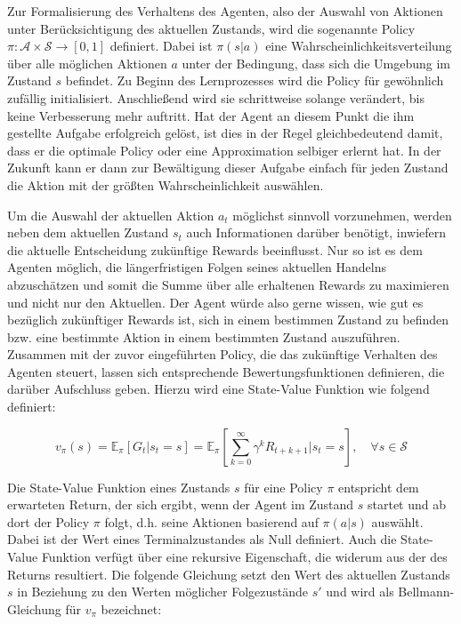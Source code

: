 Zur Formalisierung des Verhaltens des Agenten, also der Auswahl von Aktionen unter Berücksichtigung des aktuellen Zustands, wird die sogenannte Policy $\pi: \mathcal{A} \times \mathcal{S} \to [0, 1]$ definiert. Dabei ist $\pi(s|a)$ eine Wahrscheinlichkeitsverteilung über alle möglichen Aktionen $a$ unter der Bedingung, dass sich die Umgebung im Zustand $s$ befindet. Zu Beginn des Lernprozesses wird die Policy für gewöhnlich zufällig initialisiert. Anschließend wird sie schrittweise solange verändert, bis keine Verbesserung mehr auftritt. Hat der Agent an diesem Punkt die ihm gestellte Aufgabe erfolgreich gelöst, ist dies in der Regel gleichbedeutend damit, dass er die optimale Policy oder eine Approximation selbiger erlernt hat. In der Zukunft kann er dann zur Bewältigung dieser Aufgabe einfach für jeden Zustand die Aktion mit der größten Wahrscheinlichkeit auswählen.

Um die Auswahl der aktuellen Aktion $a_t$ möglichst sinnvoll vorzunehmen, werden neben dem aktuellen Zustand $s_t$ auch Informationen darüber benötigt, inwiefern die aktuelle Entscheidung zukünftige Rewards beeinflusst. Nur so ist es dem Agenten möglich, die längerfristigen Folgen seines aktuellen Handelns abzuschätzen und somit die Summe über alle erhaltenen Rewards zu maximieren und nicht nur den Aktuellen. Der Agent würde also gerne wissen, \glqq wie gut \grqq{} es bezüglich zukünftiger Rewards ist, sich in einem bestimmen Zustand zu befinden bzw. eine bestimmte Aktion in einem bestimmten Zustand auszuführen. Zusammen mit der zuvor eingeführten Policy, die das zukünftige Verhalten des Agenten steuert, lassen sich entsprechende Bewertungsfunktionen definieren, die darüber Aufschluss geben. Hierzu wird eine State-Value Funktion wie folgend definiert:

\begin{equation*}
  v_\pi(s) = \mathbb{E}_\pi[G_t|s_t=s] = \mathbb{E}_\pi[\sum_{k=0}^{\infty} \gamma^k R_{t+k+1} | s_t=s], \quad \forall s \in \mathcal{S}
  \label{v_pi_eq}
\end{equation*}

Die State-Value Funktion eines Zustands $s$ für eine Policy $\pi$ entspricht dem erwarteten Return, der sich ergibt, wenn der Agent im Zustand $s$ startet und ab dort der Policy $\pi$ folgt, d.h. seine Aktionen basierend auf $\pi(a|s)$ auswählt. Dabei ist der Wert eines Terminalzustandes als Null definiert. Auch die State-Value Funktion verfügt über eine rekursive Eigenschaft, die widerum aus der des Returns resultiert. Die folgende Gleichung setzt den Wert des aktuellen Zustands $s$ in Beziehung zu den Werten möglicher Folgezustände $s'$ und wird als Bellmann-Gleichung für $v_\pi$ bezeichnet:


